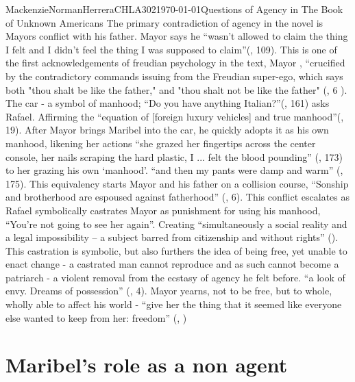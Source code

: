 \documentclass{article}
\begin{document}
\begin{mla}{Mackenzie}{Norman}{Herrera}{CHLA302}{\today}{Questions of Agency in The Book of Unknown Americans}
The primary contradiction of agency in the novel is Mayors conflict with his father. Mayor says he ``wasn’t allowed to claim the thing I felt and I didn’t feel the thing I was supposed to claim''(\cite{Henriquez2014-sh}, 109). This is one of the first acknowledgements of freudian psychology in the text, 
Mayor , ``crucified by the contradictory commands issuing from the Freudian super-ego, which says both "thou shalt be like the father," and "thou shalt not be like the father" (\cite{loves-bdy}, 6 ). The car - a symbol of manhood; ``Do you have anything Italian?''(\cite{Henriquez2014-sh}, 161) asks Rafael. Affirming the ``equation of [foreign luxury vehicles] and true manhood''(\cite{Uhlman2015-qx}, 19). After Mayor brings Maribel into the car, he quickly adopts it as his own manhood, likening her actions ``she grazed her fingertips across the center console, her nails scraping the hard plastic, I ... felt the blood pounding'' (\cite{Henriquez2014-sh}, 173) to her grazing his own `manhood'. ``and then my pants were damp and warm'' (\cite{Henriquez2014-sh}, 175). This equivalency starts Mayor and his father on a collision course, ``Sonship and brotherhood are espoused against fatherhood'' (\cite{loves-bdy}, 6). This conflict escalates as Rafael symbolically castrates Mayor as punishment for using his manhood, ``You're not going to see her again''. Creating  ``simultaneously a social reality and a legal impossibility – a subject barred from citizenship and without rights'' (\cite{Lutes_Travis_2021}). This castration is symbolic, but also furthers the idea of being free, yet unable to enact change - a castrated man cannot reproduce and as such cannot become a patriarch - a violent removal from the ecstasy of agency he felt before. ``a look of envy. Dreams of possession'' (\cite{wretched}, 4). Mayor yearns, not to be free, but to whole, wholly able to affect his world - ``give her the thing that it seemed like everyone else wanted to keep from her: freedom'' (\cite{Henriquez2014-sh}, ) 

\section*{Maribel’s role as a non agent}







\printbibliography

\end{mla}
\end{document}
